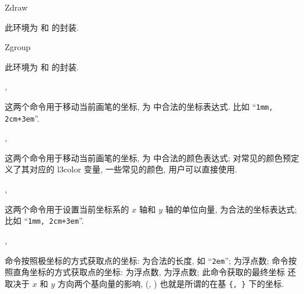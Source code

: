 \documentclass[
  hyper, lang=cn, 
  class=l3dox, 
]{../../zlatex/code/ztex}
\begin{document}
\begin{function}[added=2025-05-15]{Zdraw}
  \begin{syntax}
      
  \end{syntax}
  此环境为  和  的封装.
\end{function}


\begin{function}[added=2025-05-15]{Zgroup}
  \begin{syntax}
      
  \end{syntax}
  此环境为  和  的封装.
\end{function}


\begin{function}[added=2025-05-15]{\zmoveto, \zlineto}
  \begin{syntax}
  \end{syntax}
  这两个命令用于移动当前画笔的坐标,  为  中合法的坐标表达式.
  比如 ``\texttt{1mm, 2cm+3em}''.
\end{function}


\begin{function}[added=2025-05-15]{\zscolor, \zfcolor}
  \begin{syntax}
  \end{syntax}
  这两个命令用于移动当前画笔的坐标,  为  中合法的颜色表达式;
  \ztikz{} 对常见的颜色预定义了其对应的 l3color 变量, 一些常见的颜色, 用户可以直接使用.
\end{function}


\begin{function}[added=2025-05-15]{\zxvec, \zyvec}
  \begin{syntax}
  \end{syntax}
  这两个命令用于设置当前坐标系的 $x$ 轴和 $y$ 轴的单位向量,  为合法的坐标表达式;
  比如 ``\texttt{1mm, 2cm+3em}''.
\end{function}


\begin{function}[added=2025-05-15]{\zpolar, \zcoor}
  \begin{syntax}
  \end{syntax}
   命令按照极坐标的方式获取点的坐标: 为合法的长度, 如 ``\texttt{2em}'';  为浮点数; 
   命令按照直角坐标的方式获取点的坐标:  为浮点数,  为浮点数; 此命令获取的最终坐标
  还取决于 $x$ 和 $y$ 方向两个基向量的影响, (, ) 也就是所谓的在基 \texttt{\{, \}} 
  下的坐标.
\end{function}
\end{document}
